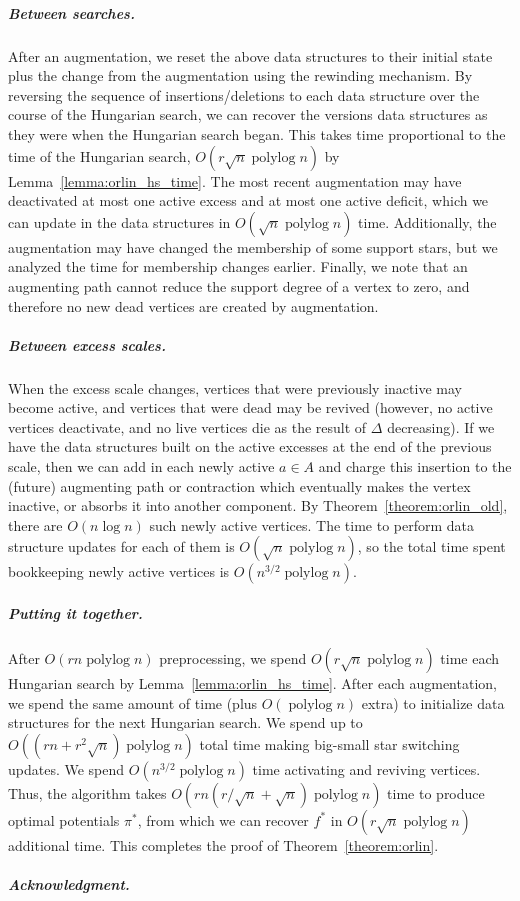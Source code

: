 \documentclass[a4paper,UKenglish]{socg-lipics-v2018}
\def\polylog{\mathop{\mathrm{polylog}}}
\theoremstyle{plain}
\numberwithin{figure}{section}
\renewcommand{\paragraph}{\subparagraph}
\begin{document}
\paragraph{Between searches.}
After an augmentation, we reset the above data structures to their initial
state plus the change from the augmentation using the rewinding mechanism.
By reversing the sequence of insertions/deletions to each data structure over
the course of the Hungarian search, we can recover the versions data structures
as they were when the Hungarian search began.
This takes time proportional to the time of the Hungarian search,
$O(r\sqrt{n}\polylog n)$ by Lemma~\ref{lemma:orlin_hs_time}.
The most recent augmentation may have deactivated at most one active excess and
at most one active deficit, which we can update in the data structures in
$O(\sqrt{n}\polylog n)$ time.
Additionally, the augmentation may have changed the membership of some support
stars, but we analyzed the time for membership changes earlier.
Finally, we note that an augmenting path cannot reduce the support degree of
a vertex to zero, and therefore no new dead vertices are created by
augmentation.

\paragraph{Between excess scales.}
When the excess scale changes, vertices that were previously inactive may
become active, and vertices that were dead may be revived
(however, no active vertices deactivate, and no live vertices die as the
result of $\Delta$ decreasing).
If we have the data structures built on the active excesses at the end of the
previous scale, then we can add in each newly active $a \in A$ and
charge this insertion to the (future) augmenting path or contraction which
eventually makes the vertex inactive, or absorbs it into another component.
By Theorem~\ref{theorem:orlin_old}, there are $O(n\log n)$ such newly active
vertices.
The time to perform data structure updates for each of them is
$O(\sqrt{n}\polylog n)$, so the total time spent bookkeeping newly active
vertices is $O(n^{3/2}\polylog n)$.

\paragraph{Putting it together.}
After $O(rn\polylog n)$ preprocessing, we spend $O(r\sqrt{n}\polylog n)$ time
each Hungarian search by Lemma~\ref{lemma:orlin_hs_time}.
After each augmentation, we spend the same amount of time (plus $O(\polylog n)$
extra) to initialize data structures for the next Hungarian search.
We spend up to $O((rn + r^2\sqrt{n})\polylog n)$ total time making big-small
star switching updates.
We spend $O(n^{3/2}\polylog n)$ time activating and reviving vertices.
Thus, the algorithm takes $O(rn(r/\sqrt{n} + \sqrt{n})\polylog n)$ time to
produce optimal potentials $\pi^*$, from which we can recover $f^*$ in
$O(r\sqrt{n}\polylog n)$ %
additional time.
This completes the proof of Theorem~\ref{theorem:orlin}.


\paragraph*{Acknowledgment.}




\newpage
\appendix
\end{document}
